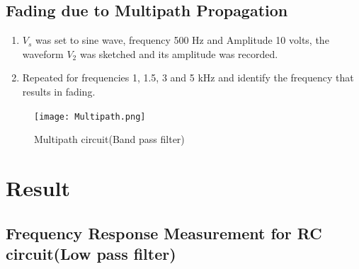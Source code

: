 \documentclass[a4paper, 12pt, english]{article}
\begin{document}

\subsection{Fading due to Multipath Propagation}

\begin{enumerate}
	\item $V_s$ was set to sine wave, frequency 500 Hz and Amplitude 10 volts, the waveform $V_2$ was sketched and  its amplitude was recorded.
	\item Repeated for frequencies 1, 1.5, 3 and 5 kHz and identify the frequency that
	      results in fading.
\end{enumerate}

\begin{figure}[!ht]
	\begin{center}
		\texttt{[image: Multipath.png]}
	\end{center}
	\caption{\label{fig:Multipath}Multipath circuit(Band pass filter)}
\end{figure}

\null\newpage
\section{Result}


\subsection{Frequency Response Measurement for RC circuit(Low pass filter)}

\end{document}
